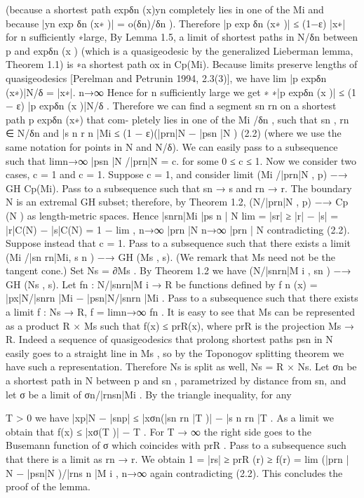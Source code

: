 (because a shortest path expδn (x)yn completely lies in one of the Mi and because
|yn exp δn (x∗ )| = o(δn)/δn ). Therefore |p exp δn (x∗ )| ≤ (1−ε) |x∗| for n sufficiently
∗large, By Lemma 1.5, a limit of shortest paths in N/δn between p and expδn (x )
(which is a quasigeodesic by the generalized Lieberman lemma, Theorem 1.1) is
∗a shortest path ox in Cp(Mi). Because limits preserve lengths of quasigeodesics
[Perelman and Petrunin 1994, 2.3(3)], we have
lim |p expδn (x∗)|N/δ = |x∗|.
n→∞
Hence for n sufficiently large we get
∗ ∗|p expδn (x )| ≤ (1 − ε) |p expδn (x )|N/δ .
Therefore we can find a segment sn rn on a shortest path p expδn (x∗) that com-
pletely lies in one of the Mi /δn , such that sn , rn ∈ N/δn and
|s n r n |Mi ≤ (1 − ε)(|prn|N − |psn |N )
 (2.2)
(where we use the same notation for points in N and N/δ).
We can easily pass to a subsequence such that limn→∞ |psn |N /|prn|N = c. for
some 0 ≤ c ≤ 1.
Now we consider two cases, c = 1 and c = 1.
Suppose c = 1, and consider limit (Mi /|prn|N , p) −→ GH
 Cp(Mi). Pass to a
subsequence such that sn → s and rn → r. The boundary N is an extremal
GH
subset; therefore, by Theorem 1.2, (N/|prn|N , p) −→ Cp (N ) as length-metric
spaces. Hence
|snrn|Mi
 |ps n | N
lim
 = |sr| ≥ |r| − |s| = |r|C(N) − |s|C(N) = 1 − lim
 ,
n→∞
 |prn |N
 n→∞ |prn | N
contradicting (2.2).
Suppose instead that c = 1. Pass to a subsequence such that there exists
a limit (Mi /|sn rn|Mi, s n ) −→ GH
 (Ms , s). (We remark that Ms need not be the
tangent cone.) Set Ns = ∂Ms . By Theorem 1.2 we have
(N/|snrn|M i , sn ) −→ GH
 (Ns , s).
Let fn : N/|snrn|M i → R be functions defined by
f n (x) = |px|N/|snrn |Mi − |psn|N/|snrn |Mi .
Pass to a subsequence such that there exists a limit f : Ns → R, f = limn→∞ fn .
It is easy to see that Ms can be represented as a product R × Ms such that
f(x) ≤ prR(x), where prR is the projection Ms → R. Indeed a sequence of
quasigeodesics that prolong shortest paths psn in N easily goes to a straight line
in Ms , so by the Toponogov splitting theorem we have such a representation.
Therefore Ns is split as well, Ns = R × Ns.
Let σn be a shortest path in N between p and sn , parametrized by distance
from sn, and let σ be a limit of {σn/|rnsn|Mi }. By the triangle inequality, for any

T > 0 we have |xp|N − |snp| ≤ |xσn(|sn rn |T )| − |s n rn |T . As a limit we obtain
that f(x) ≤ |xσ(T )| − T . For T → ∞ the right side goes to the Busemann
function of σ which coincides with prR .
Pass to a subsequence such that there is a limit as rn → r. We obtain
1 = |rs| ≥ prR (r) ≥ f(r) = lim (|prn | N − |psn|N )/|rns n |M i ,
n→∞
again contradicting (2.2). This concludes the proof of the lemma.

